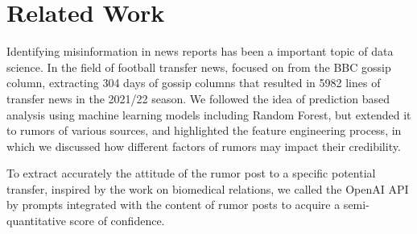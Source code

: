 \section{Related Work}
\label{sec:2_related}
Identifying misinformation in news reports has been a important topic of data science. In the field of football transfer news, \cite{runsewe2024machine} focused on from the BBC gossip column, extracting 304 days of gossip columns that resulted in 5982 lines of transfer news in the 2021/22 season. We followed the idea of prediction based analysis using machine learning models including Random Forest, but extended it to rumors of various sources, and highlighted the feature engineering process, in which we discussed how different factors of rumors may impact their credibility. 

To extract accurately the attitude of the rumor post to a specific potential transfer, inspired by the work \cite{zhou2023high} on biomedical relations, we called the OpenAI API by prompts integrated with the content of rumor posts to acquire a semi-quantitative score of confidence.